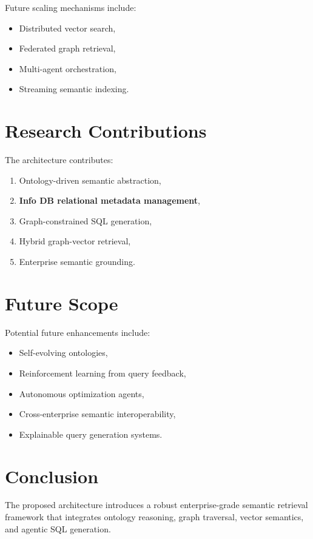 \documentclass[11pt,a4paper]{article}
\begin{document}
Future scaling mechanisms include:
\begin{itemize}
    \item Distributed vector search,
    \item Federated graph retrieval,
    \item Multi-agent orchestration,
    \item Streaming semantic indexing.
\end{itemize}

\section{Research Contributions}

The architecture contributes:
\begin{enumerate}
    \item Ontology-driven semantic abstraction,
    \item \textbf{Info DB relational metadata management},
    \item Graph-constrained SQL generation,
    \item Hybrid graph-vector retrieval,
    \item Enterprise semantic grounding.
\end{enumerate}

\section{Future Scope}

Potential future enhancements include:
\begin{itemize}
    \item Self-evolving ontologies,
    \item Reinforcement learning from query feedback,
    \item Autonomous optimization agents,
    \item Cross-enterprise semantic interoperability,
    \item Explainable query generation systems.
\end{itemize}

\section{Conclusion}

The proposed architecture introduces a robust enterprise-grade semantic retrieval framework that integrates ontology reasoning, graph traversal, vector semantics, and agentic SQL generation.
\end{document}
